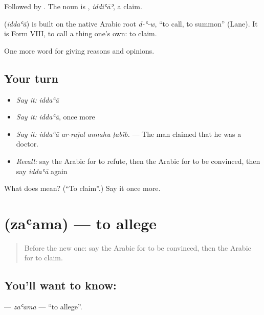 Followed by . The noun is , \emph{iddiʿāʾ}, a claim.

\begin{cousinweb}
\textbf{} (\emph{iddaʿā}) is built on the native Arabic root \emph{d-ʿ-w}, \textquotedblleft{}to call, to summon\textquotedblright{} (Lane). It is Form VIII, to call a thing one's own: to claim.
\end{cousinweb}

\begin{grammarlens}[title={What you've built}]
One more word for giving reasons and opinions.
\end{grammarlens}

\subsection*{Your turn}
\begin{itemize}
\raggedright
  \item \emph{Say it:} \emph{iddaʿā}
  \item \emph{Say it:} \emph{iddaʿā}, once more
  \item \emph{Say it:} \emph{iddaʿā ar-rajul annahu ṭabīb.} — The man claimed that he was a doctor.
  \item \emph{Recall:} say the Arabic for to refute, then the Arabic for to be convinced, then say \emph{iddaʿā} again
\end{itemize}

\begin{tcolorbox}[breakable,colback=teal!4,colframe=teal!35!black,title={Before you move on}]
What does  mean? (\textquotedblleft{}To claim\textquotedblright{}.) Say it once more.
\end{tcolorbox}
\section[\texorpdfstring{\ar{زعم} (zaʿama)}{زعم (zaʿama)}]{ (zaʿama) — to allege}

\label{lesson:AR-C366-zaama}



\begin{quote}
Before the new one: say the Arabic for to be convinced, then the Arabic for to claim.
\end{quote}

\subsection*{You'll want to know: }
\textbf{} — \emph{zaʿama} — \textquotedblleft{}to allege\textquotedblright{}.

